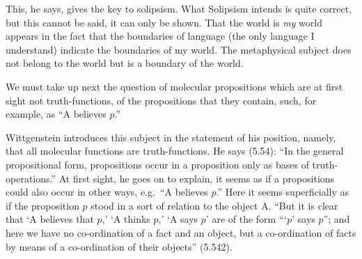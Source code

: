 This, he says, gives the key to solipsism. What Solipsism intends is quite correct, but this cannot be said, it can only be shown. That the world is \emph{my} world appears in the fact that the boundaries of language (the only language I understand) indicate the boundaries of my world. The metaphysical subject does not belong to the world but is a boundary of the world.

We must take up next the question of molecular propositions which are at first sight not truth-functions, of the propositions that they contain, such, for example, as “A believes $p$.”

Wittgenstein introduces this subject in the statement of his position, namely, that all molecular functions are truth-functions. He says (5.54): “In the general propositional form, propositions occur in a proposition only as bases of truth-operations.” At first sight, he goes on to explain, it seems as if a propositions could also occur in other ways, e.g.\ “A believes $p$.” Here it seems superficially as if the proposition $p$ stood in a sort of relation to the object A. “But it is clear that ‘A believes that $p$,’ ‘A thinks $p$,’ ‘A says $p$’ are of the form “{}‘$p$’ says $p$”; and here we have no co-ordination of a fact and an object, but a co-ordination of facts by means of a co-ordination of their objects” (5.542).

